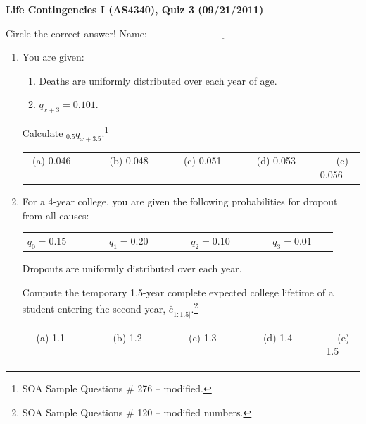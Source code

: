\documentclass[11pt,fleqn,oneside]{book}
\begin{document}
\thispagestyle{empty}
\setcounter{page}{1}
\begin{center}
{ \large \bf Life Contingencies I (AS4340), Quiz 3 (09/21/2011)}
\end{center}
\noindent
Circle the correct answer! Name: $\underline{\;\;\;\;\;\;\;\;\;\;\;\;\;\;\;\;\;\;\;\;\;\;\;\;\;\;\;\;\;\;\;\;\;\;\;\;\;\;\;\;\;\;\;\;\;\;\;\;\;\;\;\;\;}$
\begin{enumerate}
\item
You are given:
\begin{enumerate}
\item Deaths are uniformly distributed over each year of age.
\item $q_{x+3} = 0.101$.
\end{enumerate}
Calculate $_{0.5}q_{x+3.5}$.\footnote[1]{SOA Sample Questions \# 276 -- modified.}

\vspace{0.25cm}
\small
\begin{center}
\begin{tabular}{c c c c c}
(a) 0.046$\;\;\;\;\;\;\;\;$ & 
$\;\;\;\;\;\;\;\;$(b) 0.048$\;\;\;\;\;\;\;\;$ & 
$\;\;\;\;\;\;\;\;$(c) 0.051$\;\;\;\;\;\;\;\;$ &
$\;\;\;\;\;\;\;\;$(d) 0.053$\;\;\;\;\;\;\;\;$ &
$\;\;\;\;\;\;\;\;$(e) 0.056
\end{tabular}
\end{center}
\vspace{0.1cm}

\normalsize
\item For a 4-year college, you are given the following probabilities for dropout from all causes:

\begin{center}
\begin{tabular}{c c c c}
$q_0=0.15\;\;\;\;\;\;$ & 
$\;\;\;\;\;\;$$q_1=0.20\;\;\;\;\;\;$ & 
$\;\;\;\;\;\;$$q_2=0.10\;\;\;\;\;\;$ &
$\;\;\;\;\;\;$$q_3=0.01\;\;\;\;\;\;$ 
\end{tabular}
\vspace{0.1cm}
\end{center}

Dropouts are uniformly distributed over each year.

Compute the temporary 1.5-year complete expected college lifetime of a student entering the second year, $\stackrel{\circ}{e}_{1:\overline{1.5}|}$.\footnote[2]{SOA Sample Questions \# 120 -- modified numbers.} 

\vspace{0.25cm}
\small
\begin{center}
\begin{tabular}{c c c c c}
(a) 1.1$\;\;\;\;\;\;\;\;$ & 
$\;\;\;\;\;\;\;\;$(b) 1.2$\;\;\;\;\;\;\;\;$ & 
$\;\;\;\;\;\;\;\;$(c) 1.3$\;\;\;\;\;\;\;\;$ &
$\;\;\;\;\;\;\;\;$(d) 1.4$\;\;\;\;\;\;\;\;$ &
$\;\;\;\;\;\;\;\;$(e) 1.5
\end{tabular}
\end{center}
\vspace{0.1cm}


\end{enumerate}
\end{document}
